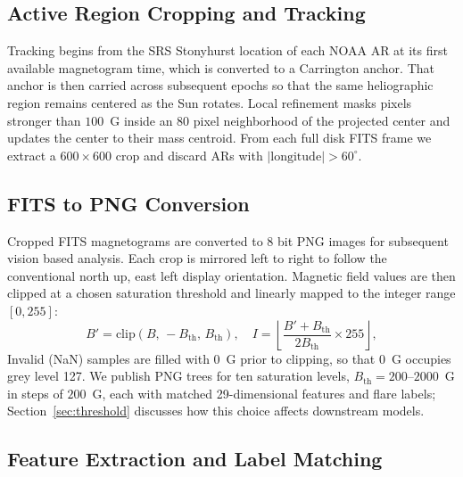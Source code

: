 \documentclass[universe,article,submit,moreauthors]{Definitions/mdpi}
\begin{document}


\subsection{Active Region Cropping and Tracking}

Tracking begins from the SRS Stonyhurst location of each NOAA AR at its first available magnetogram time, which is converted to a Carrington anchor. That anchor is then carried across subsequent epochs so that the same heliographic region remains centered as the Sun rotates. Local refinement masks pixels stronger than $100$~G inside an 80 pixel neighborhood of the projected center and updates the center to their mass centroid. From each full disk FITS frame we extract a $600\times600$ crop and discard ARs with $|\mathrm{longitude}| > 60^\circ$.

\subsection{FITS to PNG Conversion}

Cropped FITS magnetograms are converted to 8 bit PNG images for subsequent vision based analysis. Each crop is mirrored left to right to follow the conventional north up, east left display orientation. Magnetic field values are then clipped at a chosen saturation threshold and linearly mapped to the integer range $[0,255]$:
\begin{equation}
B' = \mathrm{clip}(B,\,-B_{\mathrm{th}},\,B_{\mathrm{th}}), \quad
I = \left\lfloor \frac{B' + B_{\mathrm{th}}}{2B_{\mathrm{th}}}\times 255 \right\rfloor,
\label{eq:norm}
\end{equation}
Invalid (NaN) samples are filled with $0$~G prior to clipping, so that $0$~G occupies grey level 127. We publish PNG trees for ten saturation levels, $B_{\mathrm{th}}=200$--$2000$~G in steps of $200$~G, each with matched 29-dimensional features and flare labels; Section~\ref{sec:threshold} discusses how this choice affects downstream models.

\subsection{Feature Extraction and Label Matching}
\label{sec:features}
\end{document}

